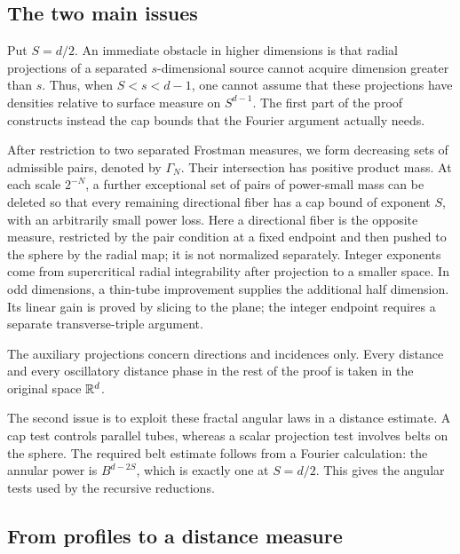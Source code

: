 \subsection{The two main issues}

Put \(S=d/2\). An immediate obstacle in higher dimensions is that
radial projections of a separated \(s\)-dimensional source cannot acquire
dimension greater than \(s\). Thus, when \(S<s<d-1\), one cannot assume that
these projections have densities relative to surface measure on
\(S^{d-1}\). The first part of the proof constructs instead the cap bounds
that the Fourier argument actually needs.

After restriction to two separated Frostman measures, we form decreasing
sets of admissible pairs, denoted by \(\Gamma_N\). Their intersection has
positive product mass. At each scale \(2^{-N}\), a further exceptional set
of pairs of power-small mass can be deleted so that every remaining
directional fiber has a cap bound of exponent \(S\), with an arbitrarily
small power loss. Here a directional fiber is the opposite measure,
restricted by the pair condition at a fixed endpoint and then pushed to
the sphere by the radial map; it is not normalized separately.
Integer exponents
come from supercritical radial integrability after projection to a smaller
space. In odd dimensions, a thin-tube improvement supplies the additional
half dimension. Its linear gain is proved by slicing to the plane; the
integer endpoint requires a separate transverse-triple argument.

The auxiliary projections concern directions and incidences only.
Every distance and every oscillatory distance phase in the rest of the
proof is taken in the original space \(\mathbb R^d\).

The second issue is to exploit these fractal angular laws in a distance
estimate. A cap test controls parallel tubes, whereas a scalar projection
test involves belts on the sphere. The required belt estimate follows
from a Fourier calculation: the annular power is \(B^{d-2S}\), which is
exactly one at \(S=d/2\). This gives the angular tests used by the
recursive reductions.

\subsection{From profiles to a distance measure}

